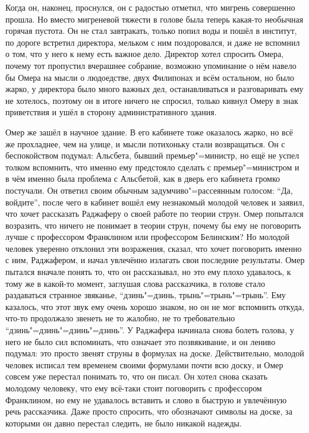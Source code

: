 Когда он, наконец, проснулся, он с радостью отметил, что мигрень совершенно
прошла.
Но вместо мигреневой тяжести в голове была теперь какая-то необычная горячая
пустота.
Он не стал завтракать, только попил воды и пошёл в институт, по дороге встретил
директора, мельком с ним поздоровался, и даже не вспомнил о том, что у него к
нему есть важное дело.
Директор хотел спросить Омера, почему тот пропустил вчерашнее собрание, возможно
упоминание о нём навело бы Омера на мысли о людоедстве, двух Филипонах и всём
остальном, но было жарко, у директора было много важных дел, останавливаться и
разговаривать ему не хотелось, поэтому он в итоге ничего не спросил, только
кивнул Омеру в знак приветствия и ушёл в сторону административного здания.

Омер же зашёл в научное здание.
В его кабинете тоже оказалось жарко, но всё же прохладнее, чем на улице, и мысли
потихоньку стали возвращаться.
Он с беспокойством подумал: Альсбета, бывший премьер"=министр, но ещё не успел
толком вспомнить, что именно ему предстояло сделать с премьер"=министром и в чём
именно была проблема с Альсбетой, как в дверь его кабинета громко постучали.
Он ответил своим обычным задумчиво"=рассеянным голосом: \enquote{Да, войдите},
после чего в кабинет вошёл ему незнакомый молодой человек и заявил, что хочет
рассказать Раджаферу о своей работе по теории струн.
Омер попытался возразить, что ничего не понимает в теории струн, почему бы ему
не поговорить лучше с профессором Франклином или профессором Белинским?
Но молодой человек уверенно отклонил эти возражения, сказал, что хочет
поговорить именно с ним, Раджафером, и начал увлечённо излагать свои последние
результаты.
Омер пытался вначале понять то, что он рассказывал, но это ему плохо удавалось,
к тому же в какой-то момент, заглушая слова рассказчика, в голове стало
раздаваться странное звяканье, \enquote{дзинь"=дзинь, трынь"=трынь"=трынь}.
Ему казалось, что этот звук ему очень хорошо знаком, но он не мог вспомнить
откуда, что-то продолжало звенеть не то жалобно, не то требовательно
\enquote{дзинь"=дзинь"=дзинь"=дзинь}.
У Раджафера начинала снова болеть голова, у него не было сил вспоминать, что
означает это позвякивание, и он лениво подумал: это просто звенят струны в
формулах на доске.
Действительно, молодой человек исписал тем временем своими формулами почти всю
доску, и Омер совсем уже перестал понимать то, что он писал.
Он хотел снова сказать молодому человеку, что ему всё-таки стоит поговорить с
профессором Франклином, но ему не удавалось вставить и слово в быструю и
увлечённую речь рассказчика.
Даже просто спросить, что обозначают символы на доске, за которыми он давно
перестал следить, не было никакой надежды.

